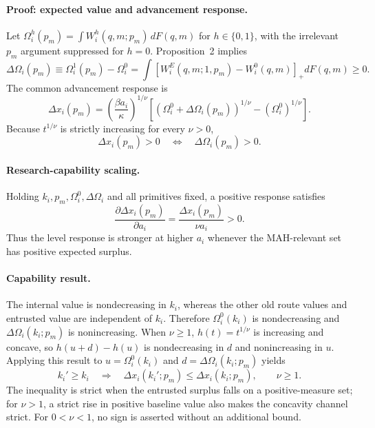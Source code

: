 \paragraph{Proof: expected value and advancement response.}
Let
\(\Omega_i^h(p_m)=\int W_i^h(q,m;p_m)\,dF(q,m)\) for
\(h\in\{0,1\}\), with the irrelevant \(p_m\) argument suppressed for
\(h=0\). Proposition~2 implies
\begin{equation}
  \Delta\Omega_i(p_m)
  \equiv
  \Omega_i^1(p_m)-\Omega_i^0
  =
  \int
  \left[W_i^E(q,m;1,p_m)-W_i^0(q,m)\right]_+
  dF(q,m)
  \geq0.
  \label{eq:p08-expected-gain}
\end{equation}
The common advancement response is
\begin{equation}
  \Delta x_i(p_m)
  =
  \left(\frac{\beta a_i}{\kappa}\right)^{1/\nu}
  \left[
    \left(\Omega_i^0+\Delta\Omega_i(p_m)\right)^{1/\nu}
    -
    \left(\Omega_i^0\right)^{1/\nu}
  \right].
  \label{eq:p08-advancement-change}
\end{equation}
Because \(t^{1/\nu}\) is strictly increasing for every \(\nu>0\),
\[
  \Delta x_i(p_m)>0
  \quad\Longleftrightarrow\quad
  \Delta\Omega_i(p_m)>0.
\]

\paragraph{Research-capability scaling.}
Holding \(k_i,p_m,\Omega_i^0,\Delta\Omega_i\) and all primitives fixed, a
positive response satisfies
\begin{equation}
  \frac{\partial\Delta x_i(p_m)}{\partial a_i}
  =
  \frac{\Delta x_i(p_m)}{\nu a_i}
  >0.
  \label{eq:p08-capability-response}
\end{equation}
Thus the level response is stronger at higher \(a_i\) whenever the
MAH-relevant set has positive expected surplus.

\paragraph{Capability result.}
The internal value is nondecreasing in \(k_i\), whereas the other old route
values and entrusted value are independent of \(k_i\). Therefore
\(\Omega_i^0(k_i)\) is nondecreasing and
\(\Delta\Omega_i(k_i;p_m)\) is nonincreasing. When \(\nu\geq1\),
\(h(t)=t^{1/\nu}\) is increasing and concave, so
\(h(u+d)-h(u)\) is nondecreasing in \(d\) and nonincreasing in \(u\).
Applying this result to \(u=\Omega_i^0(k_i)\) and
\(d=\Delta\Omega_i(k_i;p_m)\) yields
\begin{equation}
  k_i'\geq k_i
  \quad\Longrightarrow\quad
  \Delta x_i(k_i';p_m)
  \leq
  \Delta x_i(k_i;p_m),
  \qquad \nu\geq1.
  \label{eq:p08-manufacturing-response}
\end{equation}
The inequality is strict when the entrusted surplus falls on a
positive-measure set; for \(\nu>1\), a strict rise in positive baseline value
also makes the concavity channel strict. For \(0<\nu<1\), no sign is asserted
without an additional bound.

